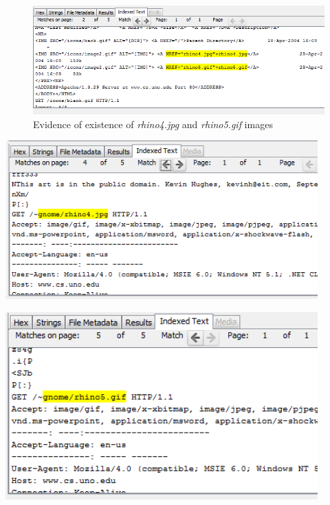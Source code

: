 \documentclass{article}
\begin{document}
\begin{figure}[h]
	\includegraphics[width=\textwidth]{img/rhino45.png}
	\caption{Evidence of existence of \textit{rhino4.jpg} and \textit{rhino5.gif} images}
	\label{fig:rhino45}
\end{figure}
\begin{minipage}[h]{0.45\textwidth}
	\centering
	\vspace{0.5cm}
	\includegraphics[width=0.9\textwidth]{img/rhino4.png}
	\vspace{1cm}
	\label{fig:rhino4}
\end{minipage}
\hspace{0.5cm}
\begin{minipage}[h]{0.45\textwidth}
	\centering
	\vspace{0.5cm}
	\includegraphics[width=0.9\textwidth]{img/rhino5.png}
	\vspace{1cm}
	\label{fig:rhino5}
\end{minipage}
\end{document}

